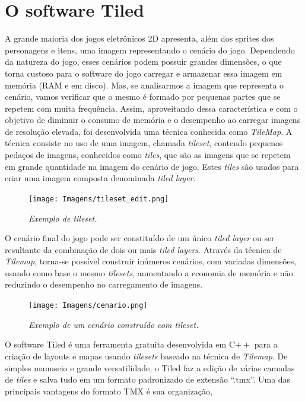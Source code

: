 \documentclass[a4paper,12pt]{report}
\begin{document}
\section{O software Tiled}
\label{tiled}
%
A grande maioria dos jogos eletrônicos 2D apresenta, além dos sprites dos personagens e itens, uma imagem representando o cenário do jogo.
Dependendo da natureza do jogo, esses cenários podem possuir grandes dimensões, o que torna custoso para o software do jogo carregar e 
armazenar essa imagem em memória (RAM e em disco). Mas, se analisarmos a imagem que representa o cenário, vamos verificar que o mesmo é formado
por pequenas partes que se repetem com muita frequência. Assim, aproveitando dessa característica e com o objetivo de diminuir o consumo de
memória e o desempenho ao carregar imagens de resolução elevada, foi desenvolvida uma técnica conhecida como \textit{TileMap}. A técnica
consiste no uso de uma imagem, chamada \textit{tileset}, contendo pequenos pedaços de imagens, conhecidos como \textit{tiles}, que são
as imagens que se repetem em grande quantidade na imagem do cenário de jogo. Estes \textit{tiles} são usados 
para criar uma imagem composta denominada \textit{tiled layer}.
%
%
\begin{figure}[H]
    \centering
    \texttt{[image: Imagens/tileset\_edit.png]}
    \caption{\textit{Exemplo de \textit{tileset}.}}
    \label{tileset_example}
\end{figure}
%
\par
%
O cenário final do jogo pode ser constituído de um único \textit{tiled layer} ou ser resultante da combinação 
de dois ou mais \textit{tiled layers}. Através da técnica de \textit{Tilemap}, torna-se possível construir inúmeros cenários,
com variadas dimensões, usando como base o mesmo \textit{tilesets}, aumentando a economia de memória e não reduzindo o desempenho 
no carregamento de imagens.
%
%
%
\begin{figure}[H]
    \centering
    \texttt{[image: Imagens/cenario.png]}
    \caption{\textit{Exemplo de um cenário construído com tileset.}}
    \label{cenario_example}
\end{figure}
%
%
\par
O software Tiled é uma ferramenta gratuita desenvolvida em C$++$ para a criação de layouts e mapas usando \textit{tilesets}
baseado na técnica de \textit{Tilemap}. De simples manuseio e grande versatilidade, o Tiled faz a edição de várias camadas 
de \textit{tiles} e salva tudo em um formato padronizado de extensão ``.tmx''. Uma das principais vantagens do formato TMX é sua organização, 
\end{document}
